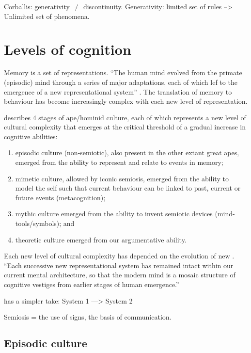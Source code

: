 \documentclass{article}
\begin{document}
Corballis: generativity $\ne$ discontinuity. Generativity: limited set of rules --> Unlimited set of phenomena.

\section{Levels of cognition}

Memory is a set of representations. “The human mind evolved from the primate (episodic) mind through a series of major adaptations, each of which lef to the emergence of a new representational system” \citep{donald1991}. The translation of memory to behaviour has become increasingly complex with each new level of representation.

\citet{donald1991} describes 4 stages of ape/hominid culture, each of which represents a new level of cultural complexity that emerges at the critical threshold of a gradual increase in cognitive abilities:

\begin{enumerate}
  \item episodic culture (non-semiotic), also present in the other extant great apes, emerged from the ability to represent and relate to events in memory;
  \item mimetic culture, allowed by iconic semiosis, emerged from the ability to model the self such that current behaviour can be linked to past, current or future events (metacognition);
  \item mythic culture emerged from the ability to invent semiotic devices (mind-tools/symbols); and
  \item theoretic culture emerged from our argumentative ability.
\end{enumerate}

Each new level of cultural complexity has depended on the evolution of new . “Each successive new representational system has remained intact within our current mental architecture, so that the modern mind is a mosaic structure of cognitive vestiges from earlier stages of human emergence.” \citep{donald1991}

\citet{collins2013} has a simpler take: System 1 ---> System 2

Semiosis = the use of signs, the basis of communication.

\subsection{Episodic culture}
\end{document}
